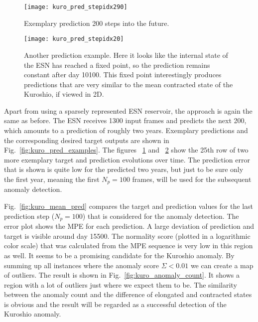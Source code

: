 \begin{figure}[p]
  \centering
  \texttt{[image: kuro\_pred\_stepidx290]}
  \caption{Exemplary prediction 200 steps into the future.}
  \label{fig:kuro_pred_stepidx290}
\end{figure}

\begin{figure}[p]
  \centering
  \texttt{[image: kuro\_pred\_stepidx20]}
  \caption{Another prediction example. Here it looks like the internal state of
  the ESN has reached a fixed point, so the prediction remains constant after
  day 10100.  This fixed point interestingly produces predictions that are very
  similar to the mean contracted state of the Kuroshio, if viewed in 2D.}
  \label{fig:kuro_pred_stepidx20}
\end{figure}



Apart from using a sparsely represented ESN reservoir, the approach is again
the same as before.  The ESN receives 1300 input frames and predicts the next
200, which amounts to a prediction of roughly two years. Exemplary predictions
and the corresponding desired target outputs are shown in
Fig.~\ref{fig:kuro_pred_examples}. The figures ~\ref{fig:kuro_pred_stepidx290}
and ~\ref{fig:kuro_pred_stepidx20} show the 25th row of two more exemplary
target and prediction evolutions over time. The prediction error that is shown
is quite low for the predicted two years, but just to be sure only the first
year, meaning the first $N_p = 100$ frames, will be used for the subsequent
anomaly detection.

Fig.~\ref{fig:kuro_mean_pred} compares the target and prediction values for the
last prediction step ($N_p=100$) that is considered for the anomaly detection.
The error plot shows the MPE for each prediction. A large deviation of
prediction and target is visible around day 15500. The normality score (plotted
in a logarithmic color scale) that was calculated from the MPE sequence is very
low in this region as well. It seems to be a promising candidate for the
Kuroshio anomaly. By summing up all instances where the anomaly score $\Sigma <
0.01$ we can create a map of outliers. The result is shown in
Fig.~\ref{fig:kuro_anomaly_count}.  It shows a region with a lot of outliers
just where we expect them to be.  The similarity between the anomaly count and
the difference of elongated and contracted states is obvious and the result
will be regarded as a successful detection of the Kuroshio anomaly.

